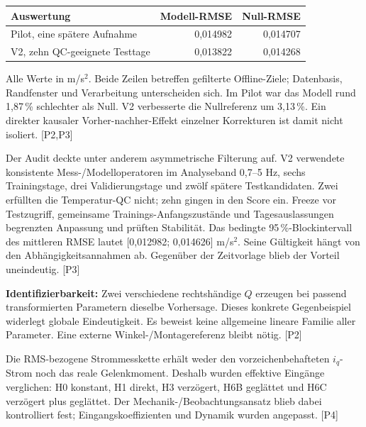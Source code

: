 \documentclass[11pt,a4paper]{article}
\newcommand{\src}[1]{{\footnotesize\color{muted}[#1]}}
\begin{document}
\begin{tabularx}{\linewidth}{Y r r}
\toprule Auswertung & Modell-RMSE & Null-RMSE\\\midrule
Pilot, eine spätere Aufnahme & 0,014982 & 0,014707\\
V2, zehn QC-geeignete Testtage & 0,013822 & 0,014268\\\bottomrule
\end{tabularx}
\smallskip Alle Werte in m/s$^2$. Beide Zeilen betreffen gefilterte Offline-Ziele; Datenbasis, Randfenster und Verarbeitung unterscheiden sich. Im Pilot war das Modell rund 1,87\,\% schlechter als Null. V2 verbesserte die Nullreferenz um 3,13\,\%. Ein direkter kausaler Vorher-nachher-Effekt einzelner Korrekturen ist damit nicht isoliert. \src{P2,P3}

Der Audit deckte unter anderem asymmetrische Filterung auf. V2 verwendete konsistente Mess-/Modelloperatoren im Analyseband 0,7--5 Hz, sechs Trainingstage, drei Validierungstage und zwölf spätere Testkandidaten. Zwei erfüllten die Temperatur-QC nicht; zehn gingen in den Score ein. Freeze vor Testzugriff, gemeinsame Trainings-Anfangszustände und Tagesauslassungen begrenzten Anpassung und prüften Stabilität. Das bedingte 95\,\%-Blockintervall des mittleren RMSE lautet [0,012982; 0,014626] m/s$^2$. Seine Gültigkeit hängt von den Abhängigkeitsannahmen ab. Gegenüber der Zeitvorlage blieb der Vorteil uneindeutig. \src{P3}

\textbf{Identifizierbarkeit:} Zwei verschiedene rechtshändige $Q$ erzeugen bei passend transformierten Parametern dieselbe Vorhersage. Dieses konkrete Gegenbeispiel widerlegt globale Eindeutigkeit. Es beweist keine allgemeine lineare Familie aller Parameter. Eine externe Winkel-/Montagereferenz bleibt nötig. \src{P2}

Die RMS-bezogene Strommesskette erhält weder den vorzeichenbehafteten $i_q$-Strom noch das reale Gelenkmoment. Deshalb wurden effektive Eingänge verglichen: H0 konstant, H1 direkt, H3 verzögert, H6B geglättet und H6C verzögert plus geglättet. Der Mechanik-/Beobachtungsansatz blieb dabei kontrolliert fest; Eingangskoeffizienten und Dynamik wurden angepasst. \src{P4}
\end{document}
